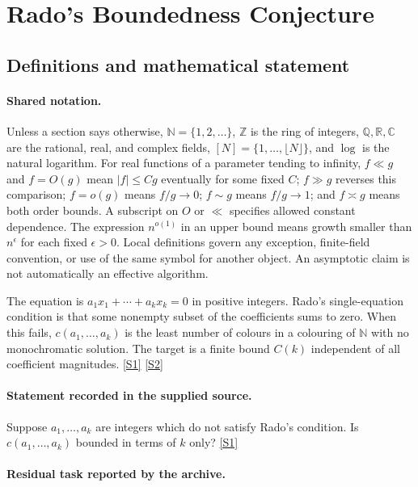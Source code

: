\documentclass[11pt,a4paper]{article}
\newcommand{\N}{\mathbb{N}}
\newcommand{\Z}{\mathbb{Z}}
\newcommand{\Q}{\mathbb{Q}}
\newcommand{\R}{\mathbb{R}}
\newcommand{\C}{\mathbb{C}}
\newcommand{\sref}[2]{\hyperlink{source:#1:#2}{[S#2]}}
\begin{document}
\section{Rado's Boundedness Conjecture}\label{statement}


\subsection{Definitions and mathematical statement}

\paragraph{Shared notation.}Unless a section says otherwise, $\N=\{1,2,\ldots\}$,
$\Z$ is the ring of integers, $\Q,\R,\C$ are the rational, real, and complex
fields, $[N]=\{1,\ldots,\lfloor N\rfloor\}$, and $\log$ is the natural
logarithm. For real functions of a parameter tending to infinity,
$f\ll g$ and $f=O(g)$ mean $|f|\leq Cg$ eventually for some fixed $C$;
$f\gg g$ reverses this comparison; $f=o(g)$ means $f/g\to0$;
$f\sim g$ means $f/g\to1$; and $f\asymp g$ means both order bounds.
A subscript on $O$ or $\ll$ specifies allowed constant dependence.
The expression $n^{o(1)}$ in an upper bound means growth smaller than
$n^\epsilon$ for each fixed $\epsilon>0$. Local definitions govern any
exception, finite-field convention, or use of the same symbol for another
object. An asymptotic claim is not automatically an effective algorithm.



The equation is $a_1x_1+\cdots+a_kx_k=0$ in positive integers. Rado's single-equation condition is that some nonempty subset of the coefficients sums to zero. When this fails, $c(a_1,\ldots,a_k)$ is the least number of colours in a colouring of $\N$ with no monochromatic solution. The target is a finite bound $C(k)$ independent of all coefficient magnitudes. \sref{statement}{1} \sref{statement}{2}

\paragraph{Statement recorded in the supplied source.}
Suppose $a_1, \dots, a_k$ are integers which do not satisfy Rado's condition. Is $c(a_1, \dots, a_k)$ bounded in terms of $k$ only? \sref{statement}{1}

\paragraph{Residual task reported by the archive.}
\end{document}
